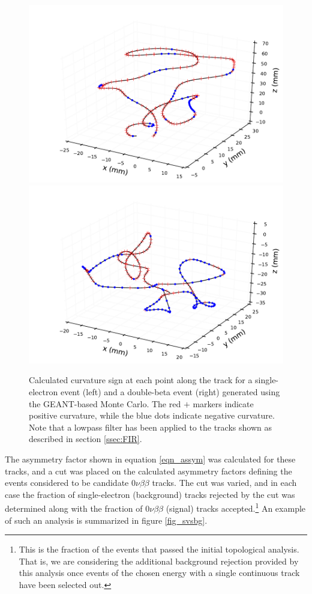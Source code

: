 \documentclass{JINST}
\begin{document}
\begin{figure}[!htb]
	\includegraphics[scale=0.48]{fig/plt_trkcurv_nmagse2_6.pdf}
	\includegraphics[scale=0.48]{fig/plt_trkcurv_nmagbb2_2.pdf}
	\caption{\label{fig_trkcurv}Calculated curvature sign at each point along the track for a single-electron event (left) and a double-beta event (right) generated using the GEANT-based Monte Carlo.  The red $+$ markers indicate positive curvature, while the blue dots indicate negative curvature.  Note that a lowpass filter has been applied to the tracks shown as described in section \protect\ref{ssec:FIR}.}
\end{figure}

The asymmetry factor shown in equation \ref{eqn_assym} was calculated for these tracks, and
a cut was placed on the calculated asymmetry factors defining the events considered to be candidate 
$0\nu\beta\beta$ tracks.  The cut was varied, and in each case 
the fraction of single-electron (background) tracks rejected by the cut was determined along with the fraction of 
$0\nu\beta\beta$ (signal) tracks accepted.\footnote{This is the fraction of the events that passed the initial 
topological analysis.  That is, we are considering the additional background rejection provided by this analysis  
once events of the chosen energy with a single continuous track have been selected out.}  An example of such 
an analysis is summarized in figure \ref{fig_svsbg}.
\end{document}
